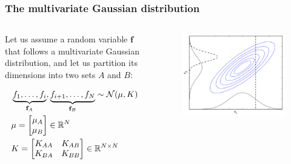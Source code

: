 \documentclass{beamer}
\begin{document}
\begin{frame}
    \frametitle{The multivariate Gaussian distribution}

    \begin{columns}
        \begin{column}{0.6\textwidth}

        Let us assume a random variable $\mathbf{f}$ that follows a multivariate
        Gaussian distribution, and let us partition its dimensions into two
        sets $A$ and $B$:

        \begin{align*}
            &\underbrace{f_1, \dots, f_i}_{\mathbf{f}_A},\underbrace{f_{i+1}, \dots, f_N}_{\mathbf{f}_B}  \sim {\cal N}(\mu, K) \\
            &\mu = \begin{bmatrix}\mu_A\\
                                  \mu_B\end{bmatrix} \in \mathbb{R}^N\\
            &K = \begin{bmatrix}K_{AA} & K_{AB} \\
                                K_{BA} & K_{BB}\end{bmatrix} \in \mathbb{R}^{N \times N}
        \end{align*}

        \end{column}
        \begin{column}{0.4\textwidth}
            \begin{figure}
            \includegraphics[width=\textwidth]{./figures/mg.png}
            \end{figure}
        \end{column}
    \end{columns}
\end{frame}
\end{document}

